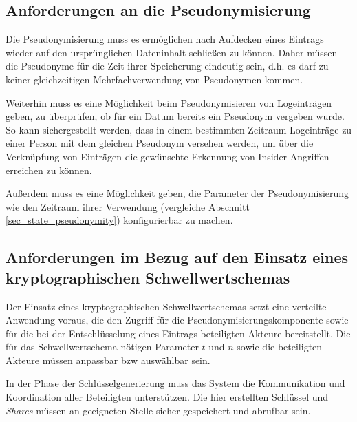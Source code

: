 \subsection{Anforderungen an die Pseudonymisierung}

\label{subsec_impl_requirements_pseudonymity}


Die Pseudonymisierung muss es ermöglichen nach Aufdecken eines Eintrags wieder auf den ursprünglichen Dateninhalt schließen zu können. Daher müssen die Pseudonyme für die Zeit ihrer Speicherung eindeutig sein, d.h. es darf zu keiner gleichzeitigen Mehrfachverwendung von Pseudonymen kommen. 

Weiterhin muss es eine Möglichkeit beim Pseudonymisieren von Logeinträgen geben, zu überprüfen, ob für ein Datum bereits ein Pseudonym vergeben wurde. So kann sichergestellt werden, dass in einem bestimmten Zeitraum Logeinträge zu einer Person mit dem gleichen Pseudonym versehen werden, um über die Verknüpfung von Einträgen die gewünschte Erkennung von Insider-Angriffen erreichen zu können.

Außerdem muss es eine Möglichkeit geben, die Parameter der Pseudonymisierung wie den Zeitraum ihrer Verwendung (vergleiche Abschnitt \ref{sec_state_pseudonymity}) konfigurierbar zu machen.

\subsection{Anforderungen im Bezug auf den Einsatz eines kryptographischen Schwellwertschemas}

\label{subsec_impl_requirements_threshold}



Der Einsatz eines kryptographischen Schwellwertschemas setzt eine verteilte Anwendung voraus, die den Zugriff für die Pseudonymisierungskomponente sowie für die bei der Entschlüsselung eines Eintrags beteiligten Akteure bereitstellt. Die für das Schwellwertschema nötigen Parameter \(t\) und \(n\) sowie die beteiligten Akteure müssen anpassbar bzw auswählbar sein.

In der Phase der Schlüsselgenerierung muss das System die Kommunikation und Koordination aller Beteiligten unterstützen. Die hier erstellten Schlüssel und \textit{Shares} müssen an geeigneten Stelle sicher gespeichert und abrufbar sein.

